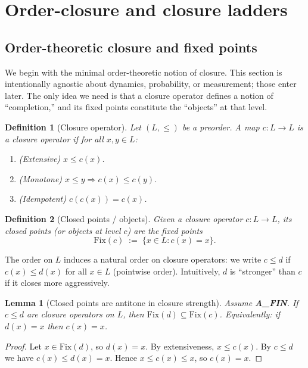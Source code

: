 \documentclass[11pt]{article}
\newtheorem{definition}{Definition}
\newtheorem{lemma}{Lemma}
\theoremstyle{remark}
\begin{document}
\section{Order-closure and closure ladders}\label{sec:closure}
\subsection{Order-theoretic closure and fixed points}

We begin with the minimal order-theoretic notion of closure. This section is intentionally
agnostic about dynamics, probability, or measurement; those enter later. The only idea we
need is that a closure operator defines a notion of ``completion,'' and its fixed points
constitute the ``objects'' at that level.

\begin{definition}[Closure operator]\label{def:closure-operator}
Let $(L,\le)$ be a preorder. A map $c:L\to L$ is a \emph{closure operator} if for all $x,y\in L$:
\begin{enumerate}
  \item (Extensive) $x \le c(x)$.
  \item (Monotone) $x \le y \Rightarrow c(x)\le c(y)$.
  \item (Idempotent) $c(c(x)) = c(x)$.
\end{enumerate}
\end{definition}

\begin{definition}[Closed points / objects]\label{def:closed-points}
Given a closure operator $c:L\to L$, its \emph{closed points} (or \emph{objects at level $c$}) are
the fixed points
\[
\mathrm{Fix}(c) \;:=\; \{x\in L : c(x)=x\}.
\]
\end{definition}

The order on $L$ induces a natural order on closure operators: we write $c \le d$ if
$c(x)\le d(x)$ for all $x\in L$ (pointwise order). Intuitively, $d$ is ``stronger'' than $c$ if it
closes more aggressively.

\begin{lemma}[Closed points are antitone in closure strength]\label{lem:closed-antitone}
Assume \textbf{A\_FIN}.
If $c \le d$ are closure operators on $L$, then $\mathrm{Fix}(d)\subseteq \mathrm{Fix}(c)$.
Equivalently: if $d(x)=x$ then $c(x)=x$.
\end{lemma}

\begin{proof}
Let $x\in \mathrm{Fix}(d)$, so $d(x)=x$. By extensiveness, $x\le c(x)$. By $c\le d$ we have
$c(x)\le d(x)=x$. Hence $x\le c(x)\le x$, so $c(x)=x$.
\end{proof}
\end{document}
